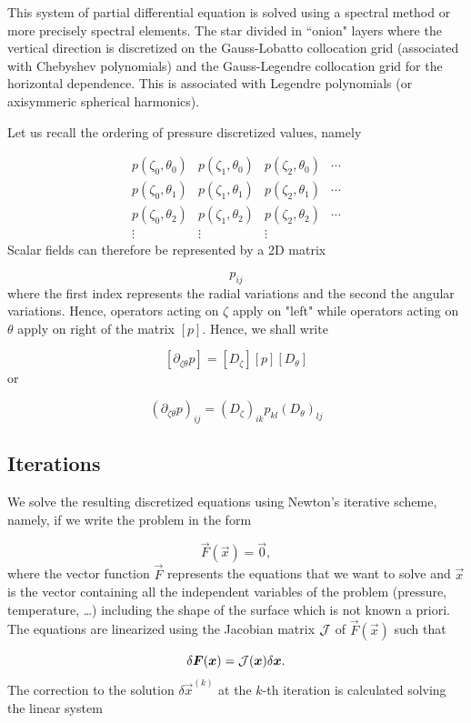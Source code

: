 This system of partial differential equation is solved using a spectral
method or more precisely spectral elements. The star divided in
``onion" layers where the vertical direction is discretized on the
Gauss-Lobatto collocation grid (associated with Chebyshev polynomials)
and the Gauss-Legendre collocation grid for the horizontal dependence.
This is associated with Legendre polynomials (or axisymmeric spherical
harmonics).

Let us recall the ordering of pressure discretized values, namely

\[\begin{array}{cccc}
p(\zeta_0,\theta_0)&p(\zeta_1,\theta_0)&p(\zeta_2,\theta_0)&\cdots\\
p(\zeta_0,\theta_1)&p(\zeta_1,\theta_1)&p(\zeta_2,\theta_1)&\cdots\\
p(\zeta_0,\theta_2)&p(\zeta_1,\theta_2)&p(\zeta_2,\theta_2)&\cdots\\
\vdots&\vdots&\vdots&
\end{array}\]
Scalar fields can therefore be represented by a 2D matrix

\[ p_{ij}\]
where the first index represents the radial variations and the second the
angular variations. Hence, operators acting on $\zeta$ apply on "left"
while operators acting on $\theta$ apply on right of the matrix $[p]$.
Hence, we shall write

\[ [\partial_{\zeta\theta}p] = [D_\zeta][p][D_\theta]\]
or

\[ (\partial_{\zeta\theta}p)_{ij} = (D_\zeta)_{ik}p_{kl}(D_\theta)_{lj}\]


\subsection{Iterations}

We solve the resulting discretized equations using Newton's iterative
scheme, namely, if  we write the problem in the form

\begin{equation}
\vec F(\vec x)=\vec 0 ,
\end{equation}
where the vector function $\vec F$ represents the equations that we
want to solve and $\vec x$ is the vector containing all the independent
variables of the problem (pressure, temperature, \ldots) including the
shape of the surface which is not known a priori.  The equations are
linearized using the Jacobian matrix $\mathcal{J}$ of $\vec F(\vec x)$ such
that

\begin{equation}
\delta\vec F(\vec x)=\tens J (\vec x) \delta\vec x .
\end{equation}
The correction to the solution $\delta \vec x^{(k)}$ at the $k$-th
iteration is calculated solving the linear system

